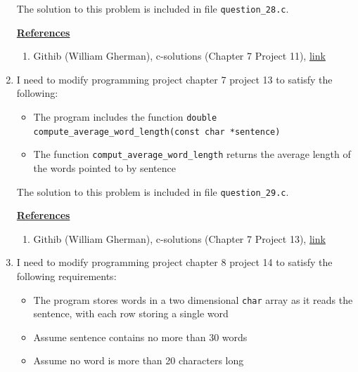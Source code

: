 \documentclass[12pt]{article}
\begin{document}
\begin{enumerate}[1.]
    \bigskip

    The solution to this problem is included in file \texttt{question\_28.c}.

    \bigskip

    \underline{\textbf{References}}

    \begin{enumerate}[1)]
        \item Githib (William Gherman), c-solutions (Chapter 7 Project 11), \href{https://github.com/williamgherman/c-solutions/blob/master/07/projects/11/11.c}{link}
    \end{enumerate}

    \item

    I need to modify programming project chapter 7 project 13 to satisfy the following:

    \begin{itemize}
        \item The program includes the function \texttt{double compute\_average\_word\_length(const char *sentence)}
        \item The function \texttt{comput\_average\_word\_length} returns the average length of the words pointed to by sentence
    \end{itemize}

    \bigskip

    The solution to this problem is included in file \texttt{question\_29.c}.

    \bigskip

    \underline{\textbf{References}}

    \begin{enumerate}[1)]
        \item Githib (William Gherman), c-solutions (Chapter 7 Project 13), \href{https://github.com/williamgherman/c-solutions/blob/master/07/projects/13/13.c}{link}
    \end{enumerate}

    \item

    I need to modify programming project chapter 8 project 14 to satisfy the following requirements:

    \begin{itemize}
        \item The program stores words in a two dimensional \texttt{char} array as it reads the sentence,
        with each row storing a single word
        \item Assume sentence contains no more than 30 words
        \item Assume no word is more than 20 characters long
    \end{itemize}


\end{enumerate}
\end{document}
